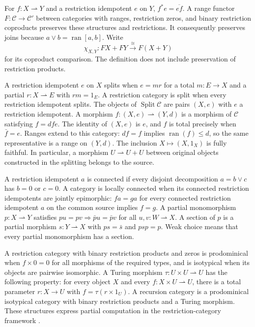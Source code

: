 \documentclass[11pt]{article}
\theoremstyle{definition}\newtheorem{definition}[theorem]{Definition}
\newcommand{\Split}{\operatorname{Split}}
\newcommand{\ran}{\operatorname{ran}}
\begin{document}
For $f:X\rightharpoonup Y$ and a restriction idempotent $e$ on $Y$,
$f^*e=\overline{ef}$. A range functor
$F:\mathcal C\to\mathcal C'$ between categories with ranges,
restriction zeros, and binary restriction coproducts preserves these
structures and restrictions. It consequently
preserves joins because $a\vee b=\ran[a,b]$. Write
\[
 \chi_{X,Y}:FX+FY\xrightarrow{\cong}F(X+Y)
\]
for its coproduct comparison. The definition does not include preservation
of restriction products.

A restriction idempotent $e$ on $X$ splits when $e=mr$ for a total
$m:E\to X$ and a partial $r:X\rightharpoonup E$ with $rm=1_E$.
A restriction category is split when every restriction idempotent
splits. The objects of $\Split\mathcal C$ are pairs $(X,e)$ with
$e$ a restriction idempotent. A morphism
$f:(X,e)\rightharpoonup(Y,d)$ is a morphism of $\mathcal C$
satisfying $f=dfe$. The identity of $(X,e)$ is $e$, and $f$ is
total precisely when $\bar f=e$. Ranges extend to this category:
$df=f$ implies $\ran(f)\le d$, so the same representative is a
range on $(Y,d)$. The inclusion $X\mapsto(X,1_X)$ is fully
faithful. In particular, a morphism $U\rightharpoonup U+U$ between
original objects constructed in the splitting belongs to the source.

A restriction idempotent $a$ is connected if every disjoint
decomposition $a=b\vee c$ has $b=0$ or $c=0$. A category is
locally connected when its connected restriction idempotents are
jointly epimorphic: $fa=ga$ for every connected restriction
idempotent $a$ on the common source implies $f=g$.
A partial monomorphism $p:X\rightharpoonup Y$ satisfies
$pu=pv\Rightarrow\bar p u=\bar p v$ for all
$u,v:W\rightharpoonup X$. A section of $p$ is a partial morphism
$s:Y\rightharpoonup X$ with $ps=\bar s$ and $psp=p$.
Weak choice means that every partial monomorphism has a section.

A restriction category with binary restriction products and zeros
is prodominical when $f\times0=0$ for all morphisms of the required
types, and is isotypical when its objects are pairwise isomorphic.
A Turing morphism $\tau:U\times U\rightharpoonup U$ has the
following property: for every object $X$ and every
$f:X\times U\rightharpoonup U$, there is a total parameter
$r:X\to U$ with $f=\tau(r\times1_U)$. A recursion category is
a prodominical isotypical category with binary restriction products
and a Turing morphism. These structures express partial computation
in the restriction-category framework
\cite{CockettLack,CockettHofstra}.
\end{document}
